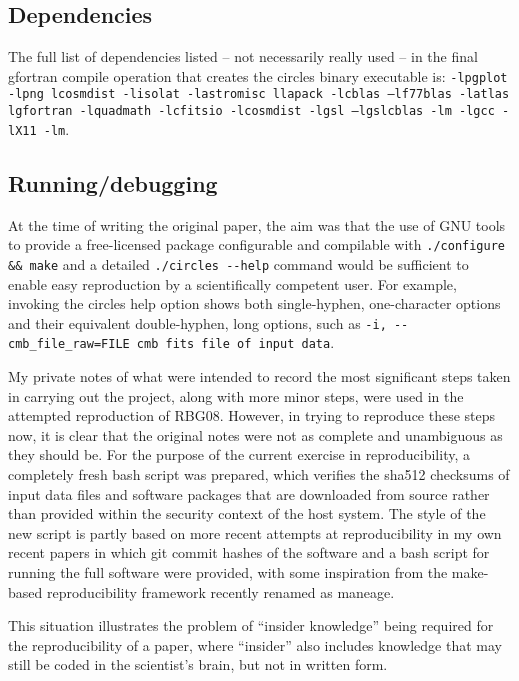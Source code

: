 \subsection{Dependencies}

The full list of dependencies listed -- not necessarily really used -- in
the final {\sc gfortran} compile operation that creates the {\sc circles}
binary executable is:
{\tt \mbox{\tt -lpgplot} -lpng lcosmdist -lisolat -lastromisc llapack -lcblas
--lf77blas -latlas lgfortran -lquadmath -lcfitsio -lcosmdist -lgsl
--lgslcblas -lm -lgcc -lX11 -lm}. \sloppy

\subsection{Running/debugging}

At the time of writing the original paper, the aim was that the use of GNU
tools to provide a free-licensed package configurable and compilable
with {\tt ./configure \&\& make} and a detailed {\tt ./circles
  -{}-help} command would be sufficient to enable easy reproduction by
a scientifically competent user. For example, invoking the {\sc
  circles} help option shows both single-hyphen, one-character options
and their equivalent double-hyphen, long options, such as
\mbox{{\tt -i,  -{}-cmb\_file\_raw=FILE cmb fits file of input data}}.
\sloppy

\fussy
My private notes of what were intended to record the most significant steps
taken in carrying out the project, along with more minor steps, were
used in the attempted reproduction of RBG08.  However, in trying to
reproduce these steps now, it is clear that the original notes were
not as complete and unambiguous as they should be.  For the purpose of
the current exercise in reproducibility, a completely fresh {\sc bash}
script was prepared, which verifies the sha512 checksums of input data
files and software packages that are downloaded from source rather
than provided within the security context of the host system. The
style of the new script is partly based on more recent attempts at
reproducibility in my own recent papers in which {\sc git} commit
hashes of the software\supercite{Roukema17silvir} and a {\sc bash}
script for running the full software\supercite{RO19flatness} were
provided, with some inspiration from the {\sc make}-based reproducibility
framework\supercite{Akhlaghi15} recently renamed as {\sc maneage}.

This situation illustrates the problem of ``insider knowledge'' being
required for the reproducibility of a paper, where ``insider'' also
includes knowledge that may still be coded in the scientist's brain,
but not in written form.

